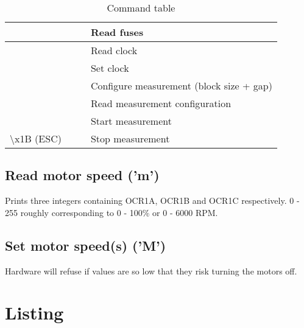 \documentclass{article}
\begin{document}
\begin{table}[H]
\begin{centering}
\begin{tabular}{|p{1.8cm}|p{1.8cm}|p{1.8cm}|p{5cm}|}
  &   &                     & Read fuses \\ \hline
  &   &                     & Read clock \\ \hline
  &   &                     & Set clock \\ \hline
  &   &                     & Configure measurement (block size + gap) \\ \hline
  &   &                     & Read measurement configuration \\ \hline
  &   &                     & Start measurement \\ \hline
{\textbackslash}x1B (ESC)  &   &                     & Stop measurement \\ \hline
\end{tabular}
\caption{Command table}
\label{command_table}
\end{centering}
\end{table}

\subsection{Read motor speed ('m')}

Prints three integers containing OCR1A, OCR1B and OCR1C respectively.
0 - 255 roughly corresponding to 0 - 100\% or 0 - 6000 RPM.

\subsection{Set motor speed(s) ('M')}

Hardware will refuse if values are so low that they risk turning the motors off.

\section{Listing}


\end{document}
